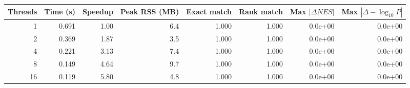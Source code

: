 \begin{tabular}{rrrrrrrr}
\toprule
Threads & Time (s) & Speedup & Peak RSS (MB) & Exact match & Rank match & Max $|\Delta NES|$ & Max $|\Delta -\log_{10}P|$ \\
\midrule
1 & 0.691 & 1.00 & 6.4 & 1.000 & 1.000 & 0.0e+00 & 0.0e+00 \\
2 & 0.369 & 1.87 & 3.5 & 1.000 & 1.000 & 0.0e+00 & 0.0e+00 \\
4 & 0.221 & 3.13 & 7.4 & 1.000 & 1.000 & 0.0e+00 & 0.0e+00 \\
8 & 0.149 & 4.64 & 9.7 & 1.000 & 1.000 & 0.0e+00 & 0.0e+00 \\
16 & 0.119 & 5.80 & 4.8 & 1.000 & 1.000 & 0.0e+00 & 0.0e+00 \\
\bottomrule
\end{tabular}
